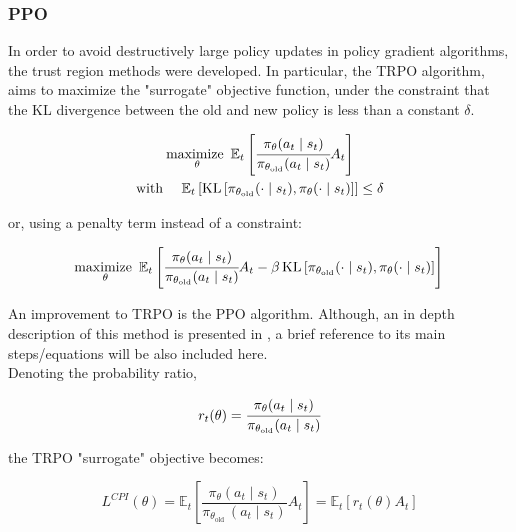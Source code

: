 \subsubsection{\acrfull{PPO}}

In order to avoid destructively large policy updates in policy gradient algorithms, the trust region methods were developed. In particular, the \gls{TRPO} algorithm, aims to maximize the "surrogate" objective function, under the constraint that the \gls{KL} divergence between the old and new policy is less than a constant $\delta$.

\begin{gather}
    \underset{\theta}{\text{maximize }} \, \mathbb{E}_t \left [ \cfrac{\pi_{\theta}(a_t \mid s_t)}{\pi _{\theta _{\text{old}}}(a_t \mid s_t)} A_t\right]\\
    \text{with } \quad \mathbb{E}_t\left [ \text{KL} \left[ \pi_{\theta_{\text{old}}}(\cdot \mid s_t), \pi_{\theta}(\cdot \mid s_t) \right ] \right] \leq \delta
\end{gather}

or, using a penalty term instead of a constraint:

\begin{equation}
    \underset{\theta}{\text{maximize }} \, \mathbb{E}_t \left [ \cfrac{\pi_{\theta}(a_t \mid s_t)}{\pi _{\theta _{\text{old}}}(a_t \mid s_t)} A_t -\beta \, \text{KL} \left [ \pi_{\theta_{\text{old}}}(\cdot \mid s_t), \pi_{\theta}(\cdot \mid s_t) \right] \right]\\    
\end{equation}

An improvement to \gls{TRPO} is the \gls{PPO} algorithm. Although, an in depth description of this method is presented in \cite{schulman2017proximal}, a brief reference to its main steps/equations will be also included here.\\

Denoting the probability ratio,

\begin{equation}
    r_t(\theta) = \cfrac{\pi_{\theta}(a_t \mid s_t)}{\pi _{\theta _{\text{old}}}(a_t \mid s_t)}
\end{equation}

the \gls{TRPO} "surrogate" objective becomes:

\begin{equation}
    L^{C P I}(\theta)=\mathbb{E}_{t}\left[\frac{\pi_{\theta}\left(a_{t} \mid s_{t}\right)}{\pi_{\theta_{\text {old }}}\left(a_{t} \mid s_{t}\right)} A_{t}\right]=\mathbb{E}_{t}\left[r_{t}(\theta) A_{t}\right]
\end{equation}

